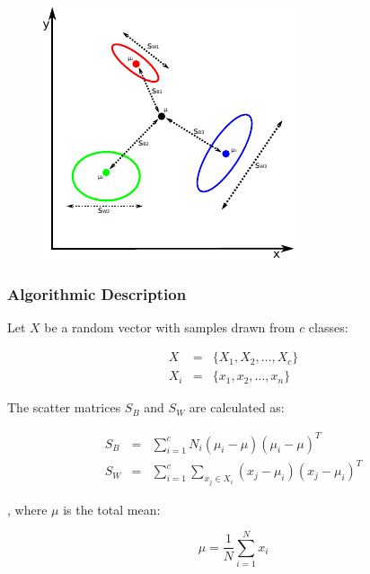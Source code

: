 \begin{figure}
	\begin{center}
		\includegraphics[scale=1.70]{img/fisherfaces/multiclasslda}
		\label{fig:scatter_matrices}
	\end{center}
\end{figure}

\subsubsection{Algorithmic Description}

Let $X$ be a random vector with samples drawn from $c$ classes:

\begin{eqnarray}
X & = & \{X_1,X_2,\ldots,X_c\} \\
X_i & = & \{x_1, x_2, \ldots, x_n\}
\end{eqnarray}

The scatter matrices $S_{B}$ and $S_{W}$ are calculated as:

\begin{eqnarray}
\label{eqn:scatter_matrices}
S_{B} & = & \sum_{i=1}^{c} N_{i} (\mu_i - \mu)(\mu_i - \mu)^{T} \\
S_{W} & = & \sum_{i=1}^{c} \sum_{x_{j} \in X_{i}} (x_j - \mu_i)(x_j - \mu_i)^{T}
\end{eqnarray}

, where $\mu$ is the total mean:

\begin{equation}
\mu = \frac{1}{N} \sum_{i=1}^{N} x_i
\end{equation}

